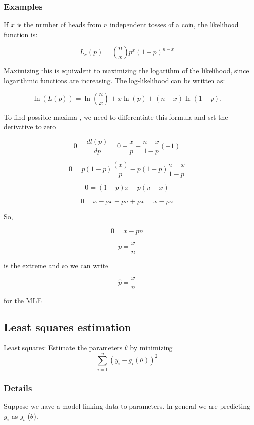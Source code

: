 \documentclass[12pt,a4paper]{article}
\theoremstyle{regla}
\theoremstyle{remark}
\theoremstyle{definition}
\theoremstyle{nonumberbreak}
\begin{document}
\subsubsection{Examples}
\begin{xmpl}
If $x$ is the number of heads from $n$ independent tosses of a coin, the likelihood function is:

$$ 
L_x(p) = {n \choose x} p^x (1-p)^{n-x} 
$$

Maximizing this is equivalent to maximizing the logarithm of the likelihood, since logarithmic functions are increasing. The log-likelihood can be written as:

$$
\ln (L(p))= \ln \binom{n}{x} + x \ln (p) + (n-x) \ln (1-p).
$$

To find possible maxima , we need to differentiate this formula and set the derivative to zero

$$ 0 = \frac{dl (p)}{dp} = 0 + \frac{x}{p}+\frac{n-x}{1-p}(-1)$$

$$ 0 = p(1-p) \frac{(x)}{p} - p(1-p)  \frac{n-x}{1-p}$$

$$ 0 = (1-p)x  - p(n-x)  $$

$$ 0 = x  - px -pn + px = x-pn  $$

So,

$$ 0 =  x-pn  $$

$$ p = \frac{x}{n} $$

is the extreme and so we can write

$$ \hat{p} = \frac{x}{n}$$

for the MLE
\end{xmpl}

\subsection{Least squares estimation}
\begin{fbox}
\begin{minipage}{0.97\textwidth}
Least squares:  Estimate the parameters $\theta$ by minimizing 
$$
\sum_{i=1}^{n}{(y_i - g_i (\theta))^2} 
$$

\end{minipage}
\end{fbox}
\subsubsection{Details}
Suppose we have a model linking data to parameters. In general we are predicting $y_i$ as $g_i$ ($\theta$).
\end{document}
